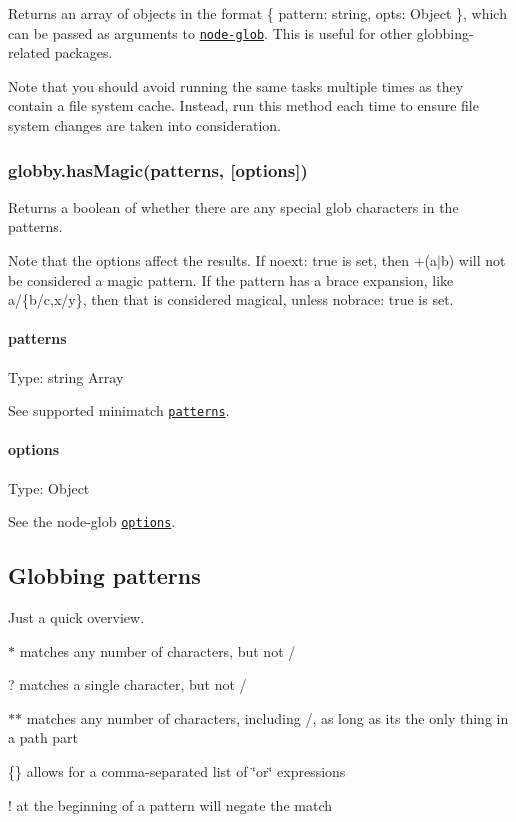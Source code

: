 Returns an array of objects in the format {\ttfamily \{ pattern\+: string, opts\+: Object \}}, which can be passed as arguments to \href{https://github.com/isaacs/node-glob}{\tt {\ttfamily node-\/glob}}. This is useful for other globbing-\/related packages.

Note that you should avoid running the same tasks multiple times as they contain a file system cache. Instead, run this method each time to ensure file system changes are taken into consideration.

\subsubsection*{globby.\+has\+Magic(patterns, \mbox{[}options\mbox{]})}

Returns a {\ttfamily boolean} of whether there are any special glob characters in the {\ttfamily patterns}.

Note that the options affect the results. If {\ttfamily noext\+: true} is set, then {\ttfamily +(a$\vert$b)} will not be considered a magic pattern. If the pattern has a brace expansion, like {\ttfamily a/\{b/c,x/y\}}, then that is considered magical, unless {\ttfamily nobrace\+: true} is set.

\paragraph*{patterns}

Type\+: {\ttfamily string} {\ttfamily Array}

See supported {\ttfamily minimatch} \href{https://github.com/isaacs/minimatch#usage}{\tt patterns}.

\paragraph*{options}

Type\+: {\ttfamily Object}

See the {\ttfamily node-\/glob} \href{https://github.com/isaacs/node-glob#options}{\tt options}.

\subsection*{Globbing patterns}

Just a quick overview.


\begin{DoxyItemize}
\item {\ttfamily $\ast$} matches any number of characters, but not {\ttfamily /}
\item {\ttfamily ?} matches a single character, but not {\ttfamily /}
\item {\ttfamily $\ast$$\ast$} matches any number of characters, including {\ttfamily /}, as long as it\textquotesingle{}s the only thing in a path part
\item {\ttfamily \{\}} allows for a comma-\/separated list of \char`\"{}or\char`\"{} expressions
\item {\ttfamily !} at the beginning of a pattern will negate the match
\end{DoxyItemize}


